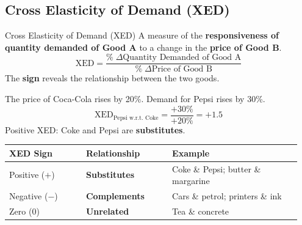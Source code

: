 \documentclass[11pt, a4paper, twoside]{book}
\begin{document}
\subsection{Cross Elasticity of Demand (XED)}



\begin{keyterm}{Cross Elasticity of Demand (XED)}
A measure of the \textbf{responsiveness of quantity demanded of Good A} to a change in the \textbf{price of Good B}.
\[
\text{XED} = \frac{\%\;\Delta\text{Quantity Demanded of Good A}}{\%\;\Delta\text{Price of Good B}}
\]
The \textbf{sign} reveals the relationship between the two goods.
\end{keyterm}

\begin{example}
The price of Coca-Cola rises by 20\%. Demand for Pepsi rises by 30\%.
\[
\text{XED}_{\text{Pepsi w.r.t.\ Coke}} = \frac{+30\%}{+20\%} = +1.5
\]
Positive XED: Coke and Pepsi are \textbf{substitutes}.
\end{example}

\begin{tcolorbox}[enhanced,colback=LightBlue,colframe=MidBlue!70,arc=0pt,boxrule=0.8pt]
\begin{tabular}{@{}>{\RaggedRight\arraybackslash}p{0.25\linewidth}>{\RaggedRight\arraybackslash}p{0.28\linewidth}>{\RaggedRight\arraybackslash}p{0.42\linewidth}@{}}
\textbf{\color{NavyPrimary}XED Sign} & \textbf{\color{NavyPrimary}Relationship} & \textbf{\color{NavyPrimary}Example} \\
\midrule
Positive ($+$) & \textbf{Substitutes} & Coke \& Pepsi; butter \& margarine \\
Negative ($-$) & \textbf{Complements} & Cars \& petrol; printers \& ink \\
Zero ($0$) & \textbf{Unrelated} & Tea \& concrete \\
\end{tabular}
\end{tcolorbox}
\end{document}
